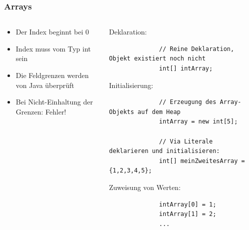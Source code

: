 \begin{frame}[fragile]
	  \frametitle{Arrays}
	   \begin{columns}
		 \begin{column}{0.5\textwidth}
			  \small
			  \begin{itemize}
			    \item Der Index beginnt bei 0
			    \item Index muss vom Typ int sein
			    \item Die Feldgrenzen werden von Java überprüft
			    \item Bei Nicht-Einhaltung der Grenzen: Fehler!
			  \end{itemize}
	  	\end{column}
	  	\begin{column}{0.5\textwidth}
	  	 \small
			  Deklaration:\\
			  \begin{lstlisting}
			  // Reine Deklaration, Objekt existiert noch nicht
			  int[] intArray;
			  \end{lstlisting}
			  
			  Initialisierung:\\
			  \begin{lstlisting}
			  // Erzeugung des Array-Objekts auf dem Heap
			  intArray = new int[5];
			  
			  // Via Literale deklarieren und initialisieren:
			  int[] meinZweitesArray = {1,2,3,4,5};
			  \end{lstlisting}
			  
			  
			  Zuweisung von Werten:\\
			  \begin{lstlisting}
			  intArray[0] = 1;
			  intArray[1] = 2;
			  ...
			  \end{lstlisting}
	  	\end{column}
	  \end{columns}
\end{frame}

